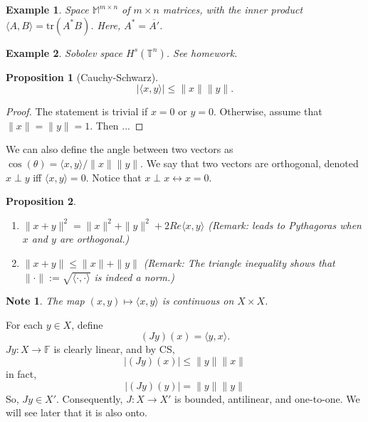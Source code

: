 \documentclass[letterpaper,twoside,11pt]{article}
\theoremstyle{mystyle}
\newtheorem*{propp}{Proposition}
\newtheorem*{ex}{Example}
\newtheorem*{note}{Note}
\begin{document}
\begin{ex}
  Space $\mathbb M^{m\times n}$ of $m\times n$ matrices, with the inner product $\langle A,B\rangle = \text{tr}(A^*B)$. Here, $A^* = \overline{A'}$. 
\end{ex}
\begin{ex}
  Sobolev space $H^s(\mathbb T^n)$. See homework. 
\end{ex}
\begin{propp}[Cauchy-Schwarz]
  \[|\langle x, y \rangle| \leq \|x\|\|y\|.\]
\end{propp}
\begin{proof}\color{red}
  The statement is trivial if $x=0$ or $y=0$. Otherwise, assume that $\|x\|=\|y\|=1$. Then ...\color{black}
\end{proof}
We can also define the angle between two vectors as $\cos(\theta) = \langle x, y\rangle / \|x\|\|y\|$. 
We say that two vectors are orthogonal, denoted $x\perp y$ iff $\langle x, y\rangle = 0$. Notice that $x\perp x \leftrightarrow x = 0$. 

\begin{propp}  
  \begin{enumerate}[label=(\alph*)]
    \item $\|x+y\|^2 = \|x\|^2 + \|y\|^2 + 2Re\langle x, y \rangle$ (Remark: leads to Pythagoras when $x$ and $y$ are orthogonal.)
    \item $\|x+y\|\leq \|x\| + \|y\|$ (Remark: The triangle inequality shows that $\|\cdot \|:= \sqrt{\langle \cdot, \cdot \rangle}$ is indeed a norm.)
  \end{enumerate}
\end{propp}
\begin{note}
  The map $(x, y) \mapsto \langle x, y\rangle$ is continuous on $X\times X$. 
\end{note}
For each $y\in X$, define 
\[(Jy)(x) = \langle y, x \rangle.\]
$Jy : X \to \mathbb F $ is clearly linear, and by CS, 
\[|(Jy)(x)|\leq \|y\|\|x\|\]
in fact, 
\[|(Jy)(y)|= \|y\|\|y\|\]
So, $Jy \in X'$. Consequently, $J: X\to X'$ is bounded, antilinear, and one-to-one. We will see later that it is also onto.  
\end{document}
